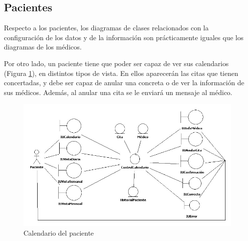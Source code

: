 \documentclass[a4paper,oneside,11pt]{book}
\begin{document}
	
	\newpage
	\subsection{Pacientes} %
	\label{sub:pacientes}
	
	Respecto a los pacientes, los diagramas de clases relacionados con la configuración de los datos y de la información son prácticamente iguales que los diagramas de los médicos.
	
	Por otro lado, un paciente tiene que poder ser capaz de ver sus calendarios (Figura \ref{fig:col_clase11}), en distintos tipos de vista. En ellos aparecerán las citas que tienen concertadas, y debe ser capaz de anular una concreta o de ver la información de sus médicos. Además, al anular una cita se le enviará un mensaje al médico.
	\begin{figure}[H]
	  \centering
	    \includegraphics[width=16cm]{img/jpg/clases/10_PacientesCalendario.jpg}
	  \caption{Calendario del paciente}
	  \label{fig:col_clase11}
	\end{figure}
	
\end{document}
